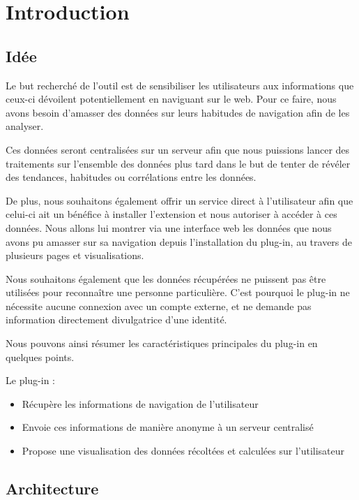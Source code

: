 
\section{Introduction}

	\subsection{Idée}

		Le but recherché de l'outil est de sensibiliser les utilisateurs aux informations que ceux-ci dévoilent potentiellement en naviguant sur le web. Pour ce faire, nous avons besoin d'amasser des données sur leurs habitudes de navigation afin de les analyser.

		Ces données seront centralisées sur un serveur afin que nous puissions lancer des traitements sur l'ensemble des données plus tard dans le but de tenter de révéler des tendances, habitudes ou corrélations entre les données.

		De plus, nous souhaitons également offrir un service direct à l'utilisateur afin que celui-ci ait un bénéfice à installer l'extension et nous autoriser à accéder à ces données. Nous allons lui montrer via une interface web les données que nous avons pu amasser sur sa navigation depuis l'installation du plug-in, au travers de plusieurs pages et visualisations.

		Nous souhaitons également que les données récupérées ne puissent pas être utilisées pour reconnaître une personne particulière. C'est pourquoi le plug-in ne nécessite aucune connexion avec un compte externe, et ne demande pas information directement divulgatrice d'une identité.

		Nous pouvons ainsi résumer les caractéristiques principales du plug-in en quelques points.

		Le plug-in :
		\begin{itemize}
			\item Récupère les informations de navigation de l'utilisateur
			\item Envoie ces informations de manière anonyme à un serveur centralisé
			\item Propose une visualisation des données récoltées et calculées sur l'utilisateur
		\end{itemize}

	\subsection{Architecture}

